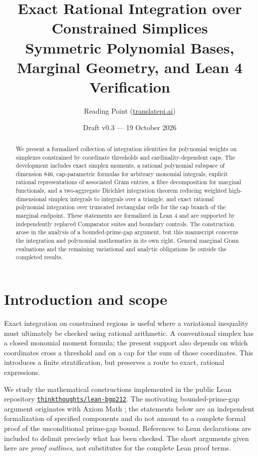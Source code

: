 \documentclass[11pt]{article}
\title{Exact Rational Integration over Constrained Simplices\\[4pt]\large Symmetric Polynomial Bases, Marginal Geometry, and Lean 4 Verification}
\author{Reading Point \texorpdfstring{(\href{https://translatepi.ai/}{translatepi.ai})}{(translatepi.ai)}}
\date{Draft v0.3 --- 19 October 2026}
\newcommand{\code}[1]{\texttt{#1}}
\begin{document}
\maketitle
\begin{abstract}
We present a formalized collection of integration identities for polynomial weights on
simplexes constrained by coordinate thresholds and cardinality-dependent caps.
The development includes exact simplex moments, a rational polynomial subspace of
dimension 846, cap-parametric formulas for arbitrary monomial integrals, explicit rational
representations of associated Gram entries, a fibre decomposition for marginal
functionals, and a two-aggregate Dirichlet integration theorem reducing weighted
high-dimensional simplex integrals to integrals over a triangle, and exact rational polynomial integration over truncated rectangular cells for the cap branch of the marginal endpoint. These statements are formalized in Lean 4 and are supported by independently
replayed Comparator suites and boundary controls. The construction arose in the analysis
of a bounded-prime-gap argument, but this manuscript concerns the integration and
polynomial mathematics in its own right. General marginal Gram evaluations and the
remaining variational and analytic obligations lie outside the completed results.
\end{abstract}

\section{Introduction and scope}
Exact integration on constrained regions is useful where a variational inequality must
ultimately be checked using rational arithmetic. A conventional simplex has a closed
monomial moment formula; the present support also depends on which coordinates cross a
threshold and on a cap for the sum of those coordinates. This introduces a finite
stratification, but preserves a route to exact, rational expressions.

We study the mathematical constructions implemented in the public Lean repository
\href{https://github.com/thinkthoughts/lean-bgp212}{\code{thinkthoughts/lean-bgp212}}.
The motivating bounded-prime-gap argument originates with Axiom Math
\cite{axiom}; the statements below are an independent formalization of specified
components and do not amount to a complete formal proof of the unconditional
prime-gap bound. References to Lean declarations are included to delimit precisely
what has been checked. The short arguments given here are \emph{proof outlines}, not
substitutes for the complete Lean proof terms.
\end{document}
